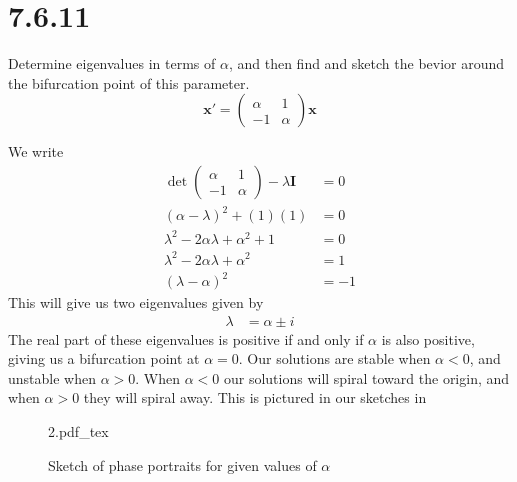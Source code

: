 \documentclass{article}
\newcommand{\incfig}[1]{%
    \def\svgwidth{.5\linewidth}
    {#1.pdf_tex}
}
\theoremstyle{definition}
\begin{document}
\section*{7.6.11}
    \begin{mdframed}[]
        Determine eigenvalues in terms of $\alpha$, and then find and sketch the bevior around the bifurcation 
        point of this parameter.
        \[
            \bm x' = \begin{pmatrix}
                \alpha & 1 \\
                -1 & \alpha
            \end{pmatrix}\bm x
        \]
    \end{mdframed}
    We write 
    \begin{align*}
        \det \begin{pmatrix}
            \alpha & 1 \\
            -1 & \alpha
        \end{pmatrix} - \lambda \bm I &= 0 \\
        (\alpha - \lambda)^2 + (1)(1) &= 0 \\
        \lambda^2 - 2\alpha \lambda + \alpha^2 + 1 &= 0 \\
        \lambda^2 - 2\alpha \lambda + \alpha^2 &= 1 \\
        (\lambda - \alpha)^2 &= -1
    \end{align*}
    This will give us two eigenvalues given by 
    \begin{align*}
        \lambda &= \alpha \pm i
    \end{align*}
    The real part of these eigenvalues is positive if and only if $\alpha$ is also positive,
    giving us a bifurcation point at $\alpha = 0$. Our solutions are stable when $\alpha < 0$,
    and unstable when $\alpha > 0$. When $\alpha < 0$ our solutions will spiral toward the origin,
    and when $\alpha > 0$ they will spiral away. This is pictured in our sketches in 
    \begin{figure}[ht]
        \centering
        \incfig{2}
        \caption{Sketch of phase portraits for given values of $\alpha$}
        \label{fig:1}
    \end{figure}
\end{document}
